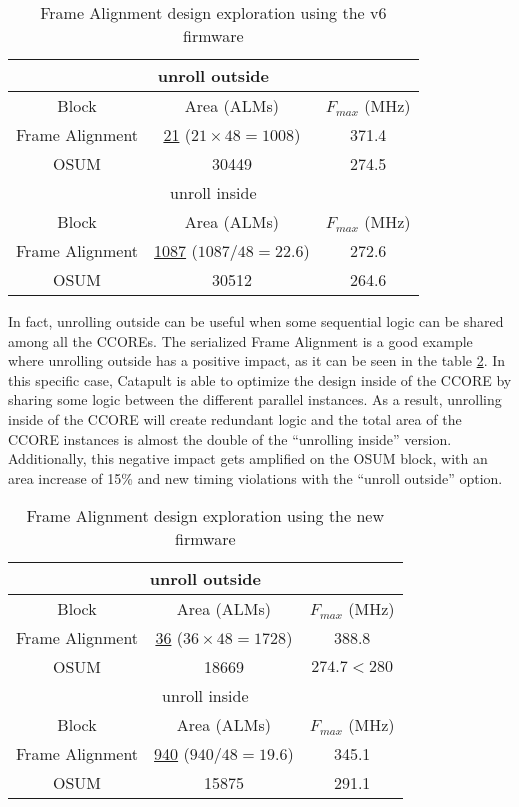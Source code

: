 \begin{table}[ht]
    \centering
    \begin{tabular}{|c|c|c|}
        \hline
        \hline
        \multicolumn{3}{|c|}{unroll outside} \\
        \hline
        Block & Area (ALMs) & \(F_{max}\) (MHz) \\
        \hline
        Frame Alignment & \underline{21} (\(21\times48=1008\)) & 371.4 \\
        OSUM & 30449 & 274.5 \\
        \hline
        \hline
        \multicolumn{3}{|c|}{unroll inside} \\
        \hline
        Block & Area (ALMs) & \(F_{max}\) (MHz) \\
        \hline
        Frame Alignment & \underline{1087} (\(1087/48=22.6\))& 272.6\\
        OSUM & 30512 & 264.6\\
        \hline
    \end{tabular}
    \caption{Frame Alignment design exploration using the v6 firmware}
    \label{tab:frame-alignment-optimization}
\end{table}

In fact, unrolling outside can be useful when some sequential logic can be shared among all the CCOREs. The serialized Frame Alignment is a good example where unrolling outside has a positive impact, as it can be seen in the table \ref{tab:new-frame-alignment-optimization}. In this specific case, Catapult is able to optimize the design inside of the CCORE by sharing some logic between the different parallel instances. As a result, unrolling inside of the CCORE will create redundant logic and the total area of the CCORE instances is almost the double of the ``unrolling inside'' version. Additionally, this negative impact gets amplified on the OSUM block, with an area increase of 15\% and new timing violations with the ``unroll outside'' option.

\begin{table}[ht]
    \centering
    \begin{tabular}{|c|c|c|}
        \hline
        \hline
        \multicolumn{3}{|c|}{unroll outside} \\
        \hline
        Block & Area (ALMs) & \(F_{max}\) (MHz) \\
        \hline
        Frame Alignment & \underline{36} (\(36\times48=1728\)) & 388.8 \\
        OSUM & 18669 & \(274.7 < 280\) \\
        \hline
        \hline
        \multicolumn{3}{|c|}{unroll inside} \\
        \hline
        Block & Area (ALMs) & \(F_{max}\) (MHz) \\
        \hline
        Frame Alignment & \underline{940} (\(940/48=19.6\))& 345.1\\
        OSUM & 15875 & 291.1\\
        \hline
    \end{tabular}
    \caption{Frame Alignment design exploration using the new firmware}
    \label{tab:new-frame-alignment-optimization}
\end{table}

